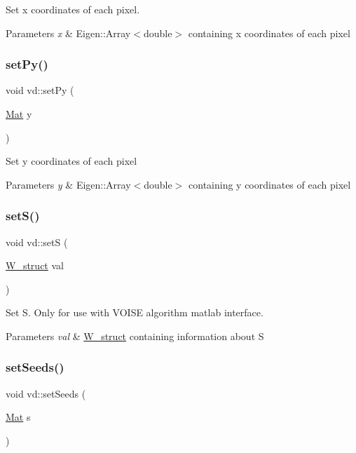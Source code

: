 Set x coordinates of each pixel. 
\begin{DoxyParams}{Parameters}
{\em x} & Eigen\+::\+Array$<$double$>$ containing x coordinates of each pixel \\
\hline
\end{DoxyParams}
\mbox{\label{classvd_a8314de29eacf72f10afee2c67b0c9819}} 
\subsubsection{\texorpdfstring{set\+Py()}{setPy()}}
{\footnotesize\ttfamily void vd\+::set\+Py (\begin{DoxyParamCaption}\item[{\mbox{\hyperlink{typedefs_8cpp_a9fa28c1f74e909474857584f5c7b0088}{Mat}}}]{y }\end{DoxyParamCaption})}

Set y coordinates of each pixel 
\begin{DoxyParams}{Parameters}
{\em y} & Eigen\+::\+Array$<$double$>$ containing y coordinates of each pixel \\
\hline
\end{DoxyParams}
\mbox{\label{classvd_a0b4c53a592ec499899a37c2e6364806a}} 
\subsubsection{\texorpdfstring{set\+S()}{setS()}}
{\footnotesize\ttfamily void vd\+::setS (\begin{DoxyParamCaption}\item[{\mbox{\hyperlink{structW__struct}{W\+\_\+struct}}}]{val }\end{DoxyParamCaption})}

Set S. Only for use with V\+O\+I\+SE algorithm matlab interface. 
\begin{DoxyParams}{Parameters}
{\em val} & \mbox{\hyperlink{structW__struct}{W\+\_\+struct}} containing information about S \\
\hline
\end{DoxyParams}
\mbox{\label{classvd_a739318bbb45d4facfcc1899c71b91720}} 
\subsubsection{\texorpdfstring{set\+Seeds()}{setSeeds()}}
{\footnotesize\ttfamily void vd\+::set\+Seeds (\begin{DoxyParamCaption}\item[{\mbox{\hyperlink{typedefs_8cpp_a9fa28c1f74e909474857584f5c7b0088}{Mat}}}]{s }\end{DoxyParamCaption})}

